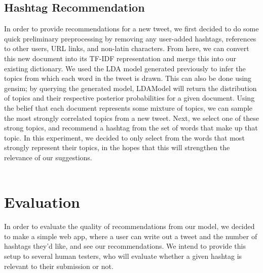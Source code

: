 \documentclass{acm_proc_article-sp}
\begin{document}
\subsection{Hashtag Recommendation}
\hspace*{5mm}In order to provide recommendations for a new tweet, we first decided to do some quick preliminary preprocessing by removing any user-added hashtags, references to other users, URL links, and non-latin characters. From here, we can convert this new document into its TF-IDF representation and merge this into our existing dictionary. We used the LDA model generated previously to infer the topics from which each word in the tweet is drawn. This can also be done using gensim; by querying the generated model, LDAModel will return the distribution of topics and their respective posterior probabilities for a given document. Using the belief that each document represents some mixture of topics, we can sample the most strongly correlated topics from a new tweet. Next, we select one of these strong topics, and recommend a hashtag from the set of words that make up that topic. In this experiment, we decided to only select from the words that most strongly represent their topics, in the hopes that this will strengthen the relevance of our suggestions.\\
​
\section{Evaluation}
\hspace*{5mm}In order to evaluate the quality of recommendations from our model, we decided to make a  simple web app, where a user can write out a tweet and the number of hashtags they'd like, and see our recommendations. We intend to provide this setup to several human testers, who will evaluate whether a given hashtag is relevant to their submission or not.\\



\end{document}
